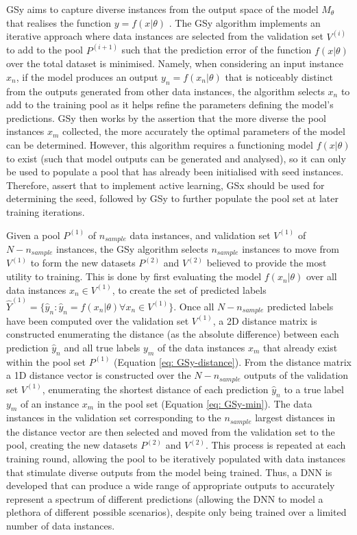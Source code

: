\documentclass[a4paper, 11pt]{report}
\begin{document}
    GSy \citep{wu-2019} aims to capture diverse instances from the output space of the model $M_{\theta}$ that realises the function $y = f( x \vert \theta )$ \citep{wu-2019}. The GSy algorithm implements an iterative approach where data instances are selected from the validation set $V^{(i)}$ to add to the pool $P^{(i+1)}$ such that the prediction error of the function $f( x \vert \theta )$ over the total dataset is minimised. Namely, when considering an input instance $x_n$, if the model produces an output $y_n = f( x_n \vert \theta )$ that is noticeably distinct from the outputs generated from other data instances, the algorithm selects $x_n$ to add to the training pool as it helps refine the parameters defining the model's predictions. GSy then works by the assertion that the more diverse the pool instances $x_m$ collected, the more accurately the optimal parameters of the model can be determined. However, this algorithm requires a functioning model $f( x \vert \theta )$ to exist (such that model outputs can be generated and analysed), so it can only be used to populate a pool that has already been initialised with seed instances. Therefore, \citet{wu-2019} assert that to implement active learning, GSx should be used for determining the seed, followed by GSy to further populate the pool set at later training iterations.

    Given a pool $P^{(1)}$ of $n_{sample}$ data instances, and validation set $V^{(1)}$ of $N - n_{sample}$ instances, the GSy algorithm selects $n_{sample}$ instances to move from $V^{(1)}$ to form the new datasets $P^{(2)}$ and $V^{(2)}$ believed to provide the most utility to training. This is done by first evaluating the model $f( x_n \vert \theta )$ over all data instances $x_n \in V^{(1)}$, to create the set of predicted labels $\hat{Y}^{(1)} = \{ \hat{y}_n \colon \hat{y}_n = f( x_n \vert \theta ) \forall x_n \in V^{(1)} \}$. Once all $N - n_{sample}$ predicted labels have been computed over the validation set $V^{(1)}$, a 2D distance matrix is constructed enumerating the distance (as the absolute difference) between each prediction $\hat{y}_n$ and all true labels $y_m$ of the data instances $x_m$ that already exist within the pool set $P^{(1)}$ (Equation \ref{eq: GSy-distance}). From the distance matrix a 1D distance vector is constructed over the $N - n_{sample}$ outputs of the validation set $V^{(1)}$, enumerating the shortest distance of each prediction $\hat{y}_n$ to a true label $y_m$ of an instance $x_m$ in the pool set (Equation \ref{eq: GSy-min}). The data instances in the validation set corresponding to the $n_{sample}$ largest distances in the distance vector are then selected and moved from the validation set to the pool, creating the new datasets $P^{(2)}$ and $V^{(2)}$. This process is repeated at each training round, allowing the pool to be iteratively populated with data instances that stimulate diverse outputs from the model being trained. Thus, a DNN is developed that can produce a wide range of appropriate outputs to accurately represent a spectrum of different predictions (allowing the DNN to model a plethora of different possible scenarios), despite only being trained over a limited number of data instances.
\end{document}

